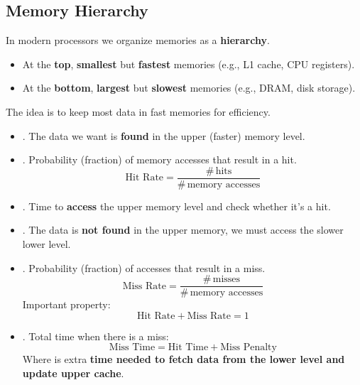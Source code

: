\subsection{Memory Hierarchy}

In modern processors we organize memories as a \textbf{hierarchy}.
\begin{itemize}
    \item At the \textbf{top}, \textbf{smallest} but \textbf{fastest} memories (e.g., L1 cache, CPU registers).
    \item At the \textbf{bottom}, \textbf{largest} but \textbf{slowest} memories (e.g., DRAM, disk storage).
\end{itemize}
The idea is to keep most data in fast memories for efficiency.
\begin{itemize}
    \item {}. The data we want is \textbf{found} in the upper (faster) memory level.

    \item {}. Probability (fraction) of memory accesses that result in a hit.
    \begin{equation}
        \text{Hit Rate} = \dfrac{\#\,\text{hits}}{\#\,\text{memory accesses}}
    \end{equation}

    \item {}. Time to \textbf{access} the upper memory level and check whether it's a hit.

    \item {}. The data is \textbf{not found} in the upper memory, we must access the slower lower level.

    \item {}. Probability (fraction) of accesses that result in a miss.
    \begin{equation}
        \text{Miss Rate} = \frac{\#\,\text{misses}}{\#\,\text{memory accesses}}
    \end{equation}
    Important property:
    \begin{equation}
        \text{Hit Rate} + \text{Miss Rate} = 1
    \end{equation}

    \item {}. Total time when there is a miss:
    \begin{equation}\label{eq: Miss Time}
        \text{Miss Time} = \text{Hit Time} + \text{Miss Penalty}
    \end{equation}
    Where  is extra \textbf{time needed to fetch data from the lower level and update upper cache}.
\end{itemize}

